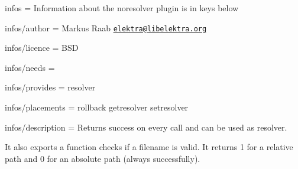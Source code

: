 
\begin{DoxyItemize}
\item infos = Information about the noresolver plugin is in keys below
\item infos/author = Markus Raab \href{mailto:elektra@libelektra.org}{\tt elektra@libelektra.\+org}
\item infos/licence = B\+S\+D
\item infos/needs =
\item infos/provides = resolver
\item infos/placements = rollback getresolver setresolver
\item infos/description = Returns success on every call and can be used as resolver.
\end{DoxyItemize}

It also exports a function checks if a filename is valid. It returns 1 for a relative path and 0 for an absolute path (always successfully). 